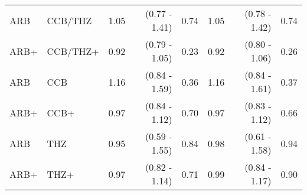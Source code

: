 \documentclass[11pt,]{article}
\begin{document}
\begin{table}[H]
{\begin{tabular}{llrrrrrr}
  ARB & CCB/THZ & 1.05 & (0.77 - 1.41) & 0.74 & 1.05 & (0.78 - 1.42) & 0.74 \\ 
  ARB+ & CCB/THZ+ & 0.92 & (0.79 - 1.05) & 0.23 & 0.92 & (0.80 - 1.06) & 0.26 \\ 
  ARB & CCB & 1.16 & (0.84 - 1.59) & 0.36 & 1.16 & (0.84 - 1.61) & 0.37 \\ 
  ARB+ & CCB+ & 0.97 & (0.84 - 1.12) & 0.70 & 0.97 & (0.83 - 1.12) & 0.66 \\ 
  ARB & THZ & 0.95 & (0.59 - 1.55) & 0.84 & 0.98 & (0.61 - 1.58) & 0.94 \\ 
  ARB+ & THZ+ & 0.97 & (0.82 - 1.14) & 0.71 & 0.99 & (0.84 - 1.17) & 0.90 \\ 
    \bottomrule
  \end{tabular}
  }
\end{table}
\begin{table}[H]
 \caption{Risk estimates for PAAS across propensity score matched, prevalent-user cohorts in the VA-OMOP data source. We report uncalibrated and calibrated hazard ratios (HRs) and their 95\% confidence intervals (CIs). (+) indicates in-combination cohorts.}
\end{table}
\end{document}
